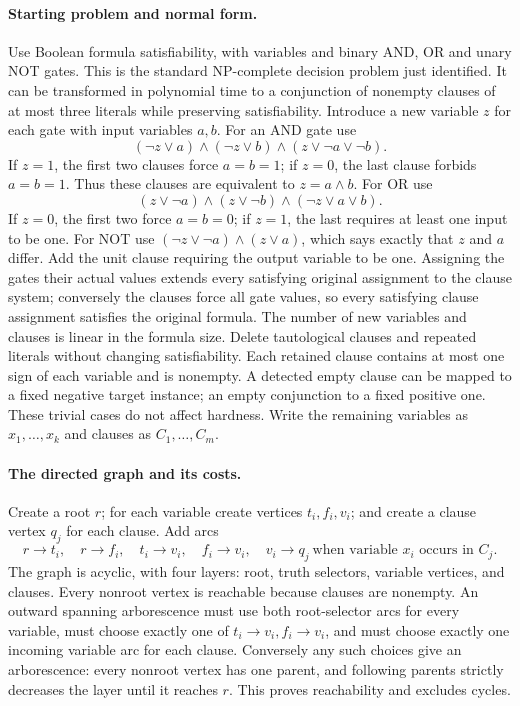 \documentclass[11pt]{article}
\begin{document}
\paragraph{Starting problem and normal form.}
Use Boolean formula satisfiability, with variables and binary AND, OR and unary NOT gates. This is the standard NP-complete decision problem just identified. It can be transformed in polynomial time to a conjunction of nonempty clauses of at most three literals while preserving satisfiability. Introduce a new variable $z$ for each gate with input variables $a,b$. For an AND gate use
\[
(\neg z\vee a)\wedge(\neg z\vee b)\wedge(z\vee\neg a\vee\neg b).
\]
If $z=1$, the first two clauses force $a=b=1$; if $z=0$, the last clause forbids $a=b=1$. Thus these clauses are equivalent to $z=a\wedge b$. For OR use
\[
(z\vee\neg a)\wedge(z\vee\neg b)\wedge(\neg z\vee a\vee b).
\]
If $z=0$, the first two force $a=b=0$; if $z=1$, the last requires at least one input to be one. For NOT use $(\neg z\vee\neg a)\wedge(z\vee a)$, which says exactly that $z$ and $a$ differ. Add the unit clause requiring the output variable to be one. Assigning the gates their actual values extends every satisfying original assignment to the clause system; conversely the clauses force all gate values, so every satisfying clause assignment satisfies the original formula. The number of new variables and clauses is linear in the formula size.
Delete tautological clauses and repeated literals without changing satisfiability. Each retained clause contains at most one sign of each variable and is nonempty. A detected empty clause can be mapped to a fixed negative target instance; an empty conjunction to a fixed positive one. These trivial cases do not affect hardness. Write the remaining variables as $x_1,\ldots,x_k$ and clauses as $C_1,\ldots,C_m$.
\paragraph{The directed graph and its costs.}
Create a root $r$; for each variable create vertices $t_i,f_i,v_i$; and create a clause vertex $q_j$ for each clause. Add arcs
\[
r\to t_i,\quad r\to f_i,\quad t_i\to v_i,\quad f_i\to v_i,
\quad v_i\to q_j\ \text{when variable }x_i\text{ occurs in }C_j.
\]
The graph is acyclic, with four layers: root, truth selectors, variable vertices, and clauses. Every nonroot vertex is reachable because clauses are nonempty. An outward spanning arborescence must use both root-selector arcs for every variable, must choose exactly one of $t_i\to v_i,f_i\to v_i$, and must choose exactly one incoming variable arc for each clause. Conversely any such choices give an arborescence: every nonroot vertex has one parent, and following parents strictly decreases the layer until it reaches $r$. This proves reachability and excludes cycles.
\end{document}
